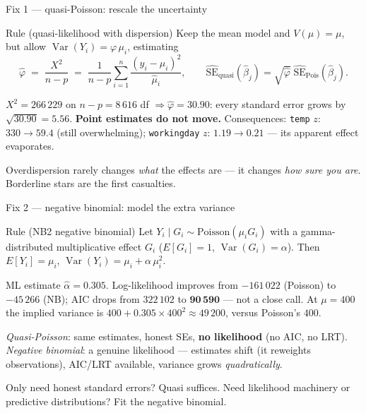 \documentclass[aspectratio=169,11pt]{beamer}
\begin{document}
\begin{frame}{Fix 1 --- quasi-Poisson: rescale the uncertainty}
  \footnotesize
  \begin{block}{Rule (quasi-likelihood with dispersion)}
    Keep the mean model and $V(\mu)=\mu$, but allow
    $\operatorname{Var}(Y_i) = \varphi\,\mu_i$, estimating
    \[
      \hat\varphi \;=\; \frac{X^2}{n-p} \;=\; \frac{1}{n-p}\sum_{i=1}^{n}\frac{(y_i-\hat\mu_i)^2}{\hat\mu_i},
      \qquad
      \widehat{\text{SE}}_{\text{quasi}}(\hat\beta_j) = \sqrt{\hat\varphi}\;\widehat{\text{SE}}_{\text{Pois}}(\hat\beta_j).
    \]
  \end{block}
  \begin{numexample}
    $X^2 = 266\,229$ on $n-p = 8\,616$ df $\Rightarrow \hat\varphi = \mathbf{30.90}$:
    every standard error grows by $\sqrt{30.90} = \mathbf{5.56}$.
    \textbf{Point estimates do not move.} Consequences:
    \texttt{temp} $z$: $330 \to 59.4$ (still overwhelming);
    \texttt{workingday} $z$: $1.19 \to \mathbf{0.21}$ --- its apparent effect
    evaporates.
  \end{numexample}
  \begin{takeaway}
    Overdispersion rarely changes \emph{what} the effects are --- it changes
    \emph{how sure you are}. Borderline stars are the first casualties.
  \end{takeaway}
\end{frame}

\begin{frame}{Fix 2 --- negative binomial: model the extra variance}
  \footnotesize
  \begin{block}{Rule (NB2 negative binomial)}
    \footnotesize
    Let $Y_i \mid G_i \sim \text{Poisson}(\mu_i G_i)$ with a gamma-distributed
    multiplicative effect $G_i$ ($E[G_i]=1$, $\operatorname{Var}(G_i)=\alpha$). Then
    \;$E[Y_i] = \mu_i$, \quad $\operatorname{Var}(Y_i) = \mu_i + \alpha\,\mu_i^2$.
  \end{block}
  \begin{numexample}
    ML estimate $\hat\alpha = \mathbf{0.305}$. Log-likelihood improves from
    $-161\,022$ (Poisson) to $-45\,266$ (NB); AIC drops from $322\,102$ to
    $\mathbf{90\,590}$ --- not a close call. At $\mu = 400$ the implied variance is
    $400 + 0.305\times 400^2 \approx 49\,200$, versus Poisson's $400$.
  \end{numexample}
  \begin{readme}
    \emph{Quasi-Poisson}: same estimates, honest SEs, \textbf{no likelihood} (no AIC,
    no LRT). \emph{Negative binomial}: a genuine likelihood --- estimates shift (it
    reweights observations), AIC/LRT available, variance grows \emph{quadratically}.
  \end{readme}
  \begin{takeaway}
    Only need honest standard errors? Quasi suffices. Need likelihood machinery or
    predictive distributions? Fit the negative binomial.
  \end{takeaway}
\end{frame}
\end{document}
